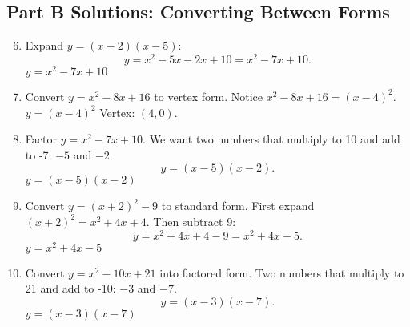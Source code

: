 \documentclass[12pt]{article}
\begin{document}
\subsection*{Part B Solutions: Converting Between Forms}
\begin{enumerate}
  \setcounter{enumi}{5}
  \item Expand \(y = (x - 2)(x - 5)\):
  \[
  y = x^2 - 5x - 2x + 10 = x^2 - 7x + 10.
  \]
  \(\boxed{y = x^2 - 7x + 10}\)

  \item Convert \(y = x^2 - 8x + 16\) to vertex form.  
  Notice \(x^2 - 8x + 16 = (x - 4)^2.\)  
  \(\boxed{y = (x - 4)^2}\)  
  Vertex: \((4, 0)\).

  \item Factor \(y = x^2 - 7x + 10\).  
  We want two numbers that multiply to 10 and add to -7: \(-5\) and \(-2.\)  
  \[
  y = (x - 5)(x - 2).
  \]
  \(\boxed{y = (x - 5)(x - 2)}\)

  \item Convert \(y = (x + 2)^2 - 9\) to standard form.  
  First expand \((x + 2)^2 = x^2 + 4x + 4.\)  
  Then subtract 9:
  \[
  y = x^2 + 4x + 4 - 9 = x^2 + 4x - 5.
  \]
  \(\boxed{y = x^2 + 4x - 5}\)

  \item Convert \(y = x^2 - 10x + 21\) into factored form.  
  Two numbers that multiply to 21 and add to -10: \(-3\) and \(-7.\)  
  \[
  y = (x - 3)(x - 7).
  \]
  \(\boxed{y = (x - 3)(x - 7)}\)
\end{enumerate}
\end{document}
